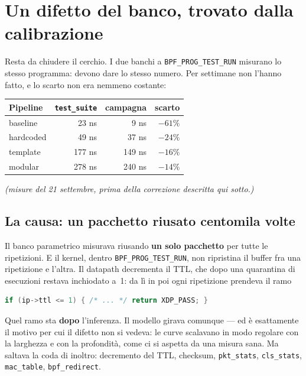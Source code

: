 \documentclass[11pt,a4paper,oneside]{report}
\begin{document}
\section{Un difetto del banco, trovato dalla calibrazione}

Resta da chiudere il cerchio. I due banchi a \texttt{BPF\_PROG\_TEST\_RUN}
misurano lo stesso programma: devono dare lo stesso numero. Per settimane non
l'hanno fatto, e lo scarto non era nemmeno costante:

\begin{center}
\small
\begin{tabular}{@{}lrrr@{}}
\toprule
\textbf{Pipeline} & \textbf{\texttt{test\_suite}} & \textbf{campagna} &
\textbf{scarto} \\
\midrule
baseline   &  23 ns &   9 ns & $-61\%$ \\
hardcoded  &  49 ns &  37 ns & $-24\%$ \\
template   & 177 ns & 149 ns & $-16\%$ \\
modular    & 278 ns & 240 ns & $-14\%$ \\
\bottomrule
\end{tabular}
\end{center}

\emph{(misure del 21 settembre, prima della correzione descritta qui sotto.)}

\subsection*{La causa: un pacchetto riusato centomila volte}

Il banco parametrico misurava riusando \textbf{un solo pacchetto} per tutte
le ripetizioni. E il kernel, dentro
\texttt{BPF\_PROG\_TEST\_RUN}, non ripristina il buffer fra una ripetizione e
l'altra. Il datapath decrementa il TTL, che dopo una quarantina
di esecuzioni restava inchiodato a~1: da lì in poi ogni ripetizione prendeva il
ramo

\begin{lstlisting}[language=C]
if (ip->ttl <= 1) { /* ... */ return XDP_PASS; }
\end{lstlisting}

Quel ramo sta \textbf{dopo} l'inferenza. Il modello girava comunque --- ed è
esattamente il motivo per cui il difetto non si vedeva: le curve scalavano in
modo regolare con la larghezza e con la profondità, come ci si aspetta da una
misura sana. Ma saltava la coda di inoltro: decremento del TTL, checksum,
\texttt{pkt\_stats}, \texttt{cls\_stats}, \texttt{mac\_table},
\texttt{bpf\_redirect}.
\end{document}
